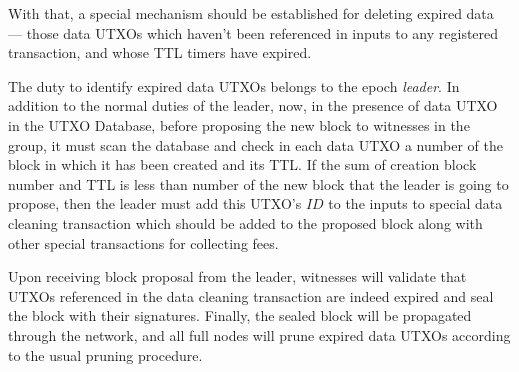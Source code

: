 \documentclass[a4paper, 10pt, conference]{ieeeconf}
\begin{document}
With that, a special mechanism should be established for deleting expired data --- those data UTXOs which haven't been referenced in inputs to any registered transaction, and whose TTL timers have expired.

The duty to identify expired data UTXOs belongs to the epoch \textit{leader}. In addition to the normal duties of the leader, now, in the presence of data UTXO in the UTXO Database, before proposing the new block to witnesses in the group, it must scan the database and check in each data UTXO a number of the block in which it has been created and its TTL. If the sum of creation block number and TTL is less than number of the new block that the leader is going to propose, then the leader must add this UTXO's $ID$ to the inputs to special data cleaning transaction which should be added to the proposed block along with other special transactions for collecting fees. 

Upon receiving block proposal from the leader, witnesses will validate that UTXOs referenced in the data cleaning transaction are indeed expired and seal the block with their signatures. Finally, the sealed block will be propagated through the network, and all full nodes will prune expired data UTXOs according to the usual pruning procedure.

\listoftodos
\end{document}
